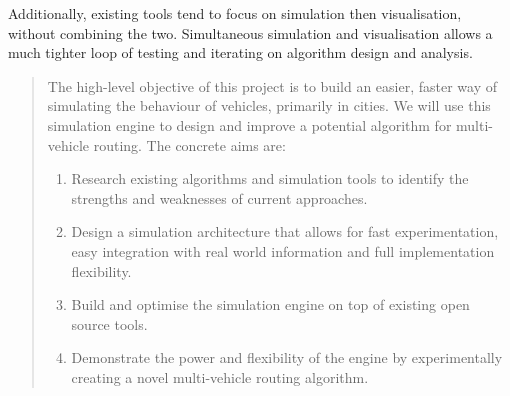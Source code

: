 \documentclass[ %
                    author={Alexander Hill},
                supervisor={Dr. Benjamin Sach},
                    degree={MEng},
                     title={MARMOSET: Multi Agent Real-time Multi-core Online
                     Simulation for Efficient Transportation},
                  subtitle={},
                      type={research},
                      year={2016} ]{dissertation}
\begin{document}
Additionally, existing tools tend to focus on simulation then visualisation,
without combining the two. Simultaneous simulation and visualisation allows a
much tighter loop of testing and iterating on algorithm design and analysis.

\begin{quote}
\noindent
The high-level objective of this project is to build an easier, faster way of
simulating the behaviour of vehicles, primarily in cities. We will use this
simulation engine to design and improve a potential algorithm for multi-vehicle
routing. The concrete aims are:

\begin{enumerate}
    \item Research existing algorithms and simulation tools to identify the
            strengths and weaknesses of current approaches.
    \item Design a simulation architecture that allows for fast experimentation,
        easy integration with real world information and full implementation
        flexibility.
    \item Build and optimise the simulation engine on top of existing open
        source tools.
    \item Demonstrate the power and flexibility of the engine by experimentally
        creating a novel multi-vehicle routing algorithm.
\end{enumerate}

\end{quote}


\end{document}
